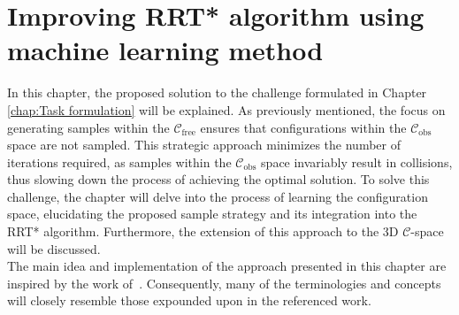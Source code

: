 \documentclass{ctuthesis}
\begin{document}
\chapter{Improving RRT* algorithm using machine learning method}  
\label{chap:Improving RRT*} 
In this chapter, 
the proposed solution to the challenge formulated in 
Chapter \ref{chap:Task formulation} will be explained. 
As previously mentioned, 
the focus on generating samples within 
the \( \mathcal{C}_{\text{free}} \) ensures that configurations 
within the \( \mathcal{C}_{\text{obs}} \) space are not sampled. 
This strategic approach minimizes the number of iterations required, 
as samples within the \( \mathcal{C}_{\text{obs}} \) space invariably result in collisions, 
thus slowing down the process of achieving the optimal solution. 
To solve this challenge, 
the chapter will delve into the process of learning the configuration space, 
elucidating the proposed sample strategy and its integration into the RRT* algorithm. 
Furthermore, the extension of this approach to the 3D $\mathcal{C}$-space will be discussed.
\\[12pt]
The main idea and implementation of the approach presented in 
this chapter are inspired by the work of~\cite{arslan2015machine}. 
Consequently, many of the terminologies and concepts will closely resemble 
those expounded upon in the referenced work.
\end{document}
